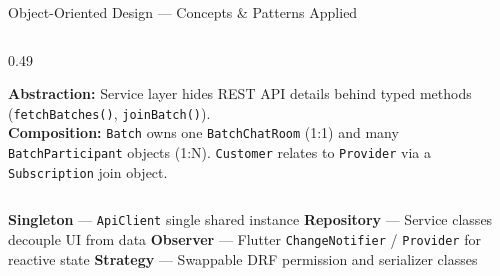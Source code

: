 \documentclass[aspectratio=169,12pt]{beamer}
\begin{document}
\begin{frame}{Object-Oriented Design --- Concepts \& Patterns Applied}
\begin{columns}[T]
\begin{column}{0.49\textwidth}
  \vspace{0.16cm}

  \begin{tcolorbox}[orangecard,title={Abstraction \& Composition}]
    \scriptsize
    \textbf{Abstraction:} Service layer hides REST API details behind typed methods (\texttt{fetchBatches()}, \texttt{joinBatch()}).\\[3pt]
    \textbf{Composition:} \texttt{Batch} owns one \texttt{BatchChatRoom} (1:1) and many \texttt{BatchParticipant} objects (1:N). \texttt{Customer} relates to \texttt{Provider} via a \texttt{Subscription} join object.
  \end{tcolorbox}

\end{column}
\end{columns}

\vspace{0.16cm}

\begin{tcolorbox}[tealstat,title={Design Patterns}]
  \scriptsize
  \textbf{Singleton} --- \texttt{ApiClient} single shared instance \quad\textbullet\quad
  \textbf{Repository} --- Service classes decouple UI from data \quad\textbullet\quad
  \textbf{Observer} --- Flutter \texttt{ChangeNotifier} / \texttt{Provider} for reactive state \quad\textbullet\quad
  \textbf{Strategy} --- Swappable DRF permission and serializer classes
\end{tcolorbox}

\end{frame}
\end{document}
